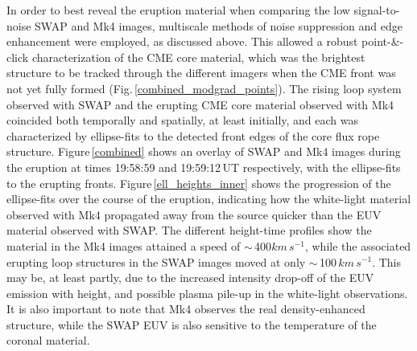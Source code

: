 \documentclass[namedreferences]{solarphysics}
\begin{document}
\begin{article}
In order to best reveal the eruption material when comparing the low signal-to-noise SWAP and Mk4 images, multiscale methods of noise suppression and edge enhancement were employed, as discussed above. This allowed a robust point-\&-click characterization of the CME core material, which was the brightest structure to be tracked through the different imagers when the CME front was not yet fully formed (Fig.\,\ref{combined_modgrad_points}). The rising loop system observed with SWAP and the erupting CME core material observed with Mk4 coincided both temporally and spatially, at least initially, and each was characterized by ellipse-fits to the detected front edges of the core flux rope structure. Figure\,\ref{combined} shows an overlay of SWAP and Mk4 images during the eruption at times 19:58:59 and 19:59:12\,UT respectively, with the ellipse-fits to the erupting fronts. Figure\,\ref{ell_heights_inner} shows the progression of the ellipse-fits over the course of the eruption, indicating how the white-light material observed with Mk4 propagated away from the source quicker than the EUV material observed with SWAP. The different height-time profiles show the material in the Mk4 images attained a speed of $\sim$\,400$km\,s^{-1}$, while the associated erupting loop structures in the SWAP images moved at only $\sim$\,100$\,km\,s^{-1}$. This may be, at least partly, due to the increased intensity drop-off of the EUV emission with height, and possible plasma pile-up in the white-light observations. It is also important to note that Mk4 observes the real density-enhanced structure, while the SWAP EUV is also sensitive to the temperature of the coronal material.


\end{article}
\end{document}
